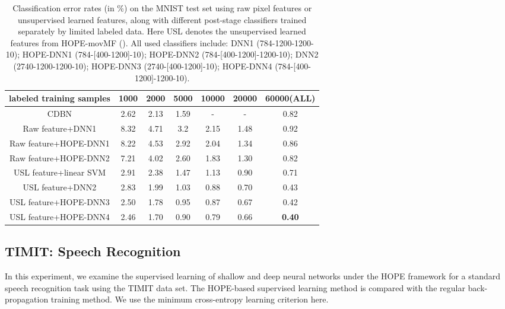\documentclass[11pt]{article}
\begin{document}
\begin{table}
	\centering
	\caption{Classification error rates (in \%) on the MNIST test set using raw pixel features or unsupervised learned features, along with different post-stage classifiers trained separately by limited labeled data. Here USL denotes the unsupervised learned features from HOPE-movMF (). All used classifiers include: DNN1 (784-1200-1200-10);  HOPE-DNN1 (784-[400-1200]-10); HOPE-DNN2 (784-[400-1200]-1200-10); DNN2 (2740-1200-1200-10); HOPE-DNN3 (2740-[400-1200]-10); HOPE-DNN4 (784-[400-1200]-1200-10).}
	\begin{tabular}{|c|c|c|c|c|c|c|} \hline
		 labeled training samples & 1000 & 2000  & 5000 & 10000  & 20000  & 60000(ALL)  \\ \hline
		 CDBN\cite{Lee2009CDBN} &  2.62 & 2.13  & 1.59  & - &  - & 0.82 \\ \hline \hline
		 Raw feature+DNN1 & 8.32 & 4.71 & 3.2  & 2.15 & 1.48 & 0.92  \\ \hline
		 Raw feature+HOPE-DNN1 &  8.22& 4.53 & 2.92 & 2.04 & 1.34  & 0.86  \\ \hline
		 Raw feature+HOPE-DNN2 & 7.21 & 4.02 & 2.60 & 1.83 & 1.30  & 0.82 \\ \hline \hline
USL feature+linear SVM & 2.91 & 2.38 & 1.47 & 1.13 & 0.90 & 0.71 \\ \hline
		 USL feature+DNN2 & 2.83 & 1.99 & 1.03 & 0.88  & 0.70 & 0.43 \\ \hline
		 USL feature+HOPE-DNN3 & 2.50  & 1.78 & 0.95 & 0.87  & 0.67 & 0.42 \\ \hline
		 USL feature+HOPE-DNN4 & 2.46 & 1.70 & 0.90 & 0.79 & 0.66 & {\bf 0.40} \\ \hline
	\end{tabular} 
	\label{MNIST_Semi_SL}
\end{table}

\subsection{TIMIT: Speech Recognition}
\label{exp-TIMIT}

In this experiment, we examine the supervised learning of shallow and deep neural networks under the HOPE framework 
for a standard speech recognition task using the TIMIT data set. The HOPE-based supervised learning method is compared with  the regular back-propagation training method. We use the minimum cross-entropy learning criterion here.
\end{document}
